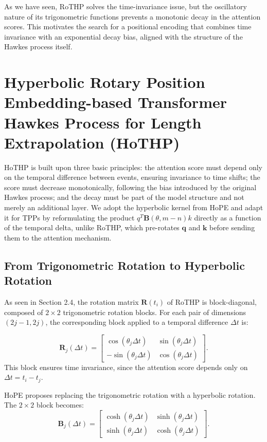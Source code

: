 \documentclass[runningheads]{llncs}
\begin{document}
As we have seen, RoTHP solves the time-invariance issue, but the oscillatory nature of its trigonometric functions prevents a monotonic decay in the attention scores. This motivates the search for a positional encoding that combines time invariance with an exponential decay bias, aligned with the structure of the Hawkes process itself.


\section{Hyperbolic Rotary Position Embedding-based Transformer Hawkes Process for Length Extrapolation (HoTHP)}

HoTHP is built upon three basic principles: the attention score must depend only on the temporal difference between events, ensuring invariance to time shifts; the score must decrease monotonically, following the bias introduced by the original Hawkes process; and the decay must be part of the model structure and not merely an additional layer. We adopt the hyperbolic kernel from HoPE \cite{dai2025hope} and adapt it for TPPs by reformulating the product $q^T\boldsymbol{B}(\theta,m-n)k$ directly as a function of the temporal delta, unlike RoTHP, which pre-rotates $\bm{q}$ and $\bm{k}$ before sending them to the attention mechanism.

\subsection{From Trigonometric Rotation to Hyperbolic Rotation}

As seen in Section 2.4, the rotation matrix $\bm{R}(t_i)$ of RoTHP \cite{dai2026rothp,dai2025hope} is block-diagonal, composed of $2 \times 2$ trigonometric rotation blocks. For each pair of dimensions $(2j{-}1, 2j)$, the corresponding block applied to a temporal difference $\Delta t$ is:

%
\begin{equation}
\bm{R}_j(\Delta t) = \begin{bmatrix} \cos(\theta_j \Delta t) & \sin(\theta_j \Delta t) \\ -\sin(\theta_j \Delta t) & \cos(\theta_j \Delta t) \end{bmatrix}.
\end{equation}
%
This block ensures time invariance, since the attention score depends only on $\Delta t = t_i - t_j$.

HoPE \cite{dai2025hope} proposes replacing the trigonometric rotation with a hyperbolic rotation. The $2 \times 2$ block becomes:
%
\begin{equation}
\bm{B}_j(\Delta t) = \begin{bmatrix} \cosh(\theta_j \Delta t) & \sinh(\theta_j \Delta t) \\ \sinh(\theta_j \Delta t) & \cosh(\theta_j \Delta t) \end{bmatrix}.
\label{eq:boost}
\end{equation}
%
\end{document}
